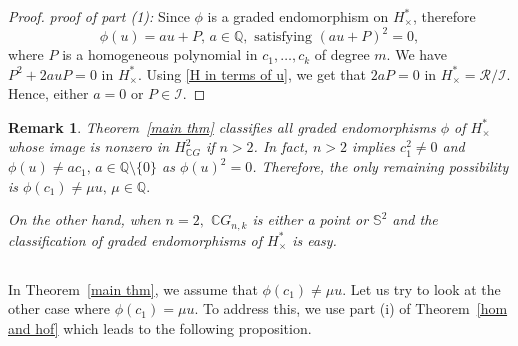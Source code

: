 \documentclass{amsart}
\newtheorem{remark}[theorem]{Remark}
\newcommand{\thmref}[1]{Theorem~\ref{#1}}
\begin{document}
\begin{proof}
		\textit{proof of part (1):} Since $\phi$ is a graded endomorphism on $H^*_{\times}$, therefore $$\phi(u) = a u + P, \, a \in \mathbb{Q}, \text{ satisfying } (a u + P)^2 =0,$$ where $P$ is a homogeneous polynomial in $c_1, \dots, c_k$ of degree $m$. We have $P^2 + 2 a u P =0$ in $H^*_{\times}$. Using \eqref{H in terms of u}, we get that $2aP =0$ in $H^*_{\times}=\mathcal{R}/\mathcal{I}$. Hence, either $a=0$ or $P\in \mathcal{I}$.
	\end{proof}
	
	
		\begin{remark}
			\thmref{main thm} classifies all graded endomorphisms $\phi$ of $H^*_\times$ whose image is nonzero in $H^2_{\mathbb CG}$ if $n>2$. In fact, $n>2$ implies $c_1^2\neq 0$ and $\phi(u) \neq ac_1,\, a \in \mathbb{Q}\setminus\{0\}$ as $\phi(u)^2=0$. Therefore, the only remaining possibility is $\phi(c_1)\neq \mu u,\, \mu \in \mathbb Q.$ 
			
			On the other hand, when $n=2,$ $\mathbb CG_{n,k}$ is either a point or $\mathbb S^2$ and the classification of graded endomorphisms of $H^*_\times$ is easy.
		\end{remark}
	
	
	
	\subsection{} In \thmref{main thm}, we assume that $\phi(c_1) \neq \mu u$. Let us try to look at the other case where $\phi(c_1) = \mu u$. To address this, we use part (i) of \thmref{hom and hof} which leads to the following proposition.
	
\end{document}
